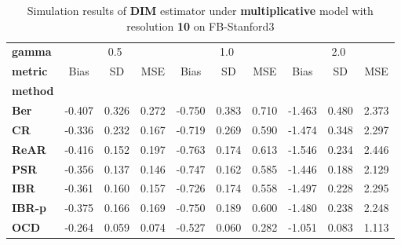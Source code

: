 \begin{table}
\centering
\caption{Simulation results of \textbf{DIM} estimator under \textbf{multiplicative} model with resolution \textbf{10} on FB-Stanford3}
\begin{tabular}{lccccccccc}
\toprule
\textbf{gamma} & \multicolumn{3}{c}{0.5} & \multicolumn{3}{c}{1.0} & \multicolumn{3}{c}{2.0} \\
\textbf{metric} &   Bias &     SD &    MSE &   Bias &     SD &    MSE &   Bias &     SD &    MSE \\
\textbf{method} &        &        &        &        &        &        &        &        &        \\
\midrule
\textbf{Ber} & -0.407 &  0.326 &  0.272 & -0.750 &  0.383 &  0.710 & -1.463 &  0.480 &  2.373 \\
\textbf{CR} & -0.336 &  0.232 &  0.167 & -0.719 &  0.269 &  0.590 & -1.474 &  0.348 &  2.297 \\
\textbf{ReAR} & -0.416 &  0.152 &  0.197 & -0.763 &  0.174 &  0.613 & -1.546 &  0.234 &  2.446 \\
\textbf{PSR} & -0.356 &  0.137 &  0.146 & -0.747 &  0.162 &  0.585 & -1.446 &  0.188 &  2.129 \\
\textbf{IBR} & -0.361 &  0.160 &  0.157 & -0.726 &  0.174 &  0.558 & -1.497 &  0.228 &  2.295 \\
\textbf{IBR-p} & -0.375 &  0.166 &  0.169 & -0.750 &  0.189 &  0.600 & -1.480 &  0.238 &  2.248 \\
\textbf{OCD} & -0.264 &  0.059 &  0.074 & -0.527 &  0.060 &  0.282 & -1.051 &  0.083 &  1.113 \\
\bottomrule
\end{tabular}
\end{table}
